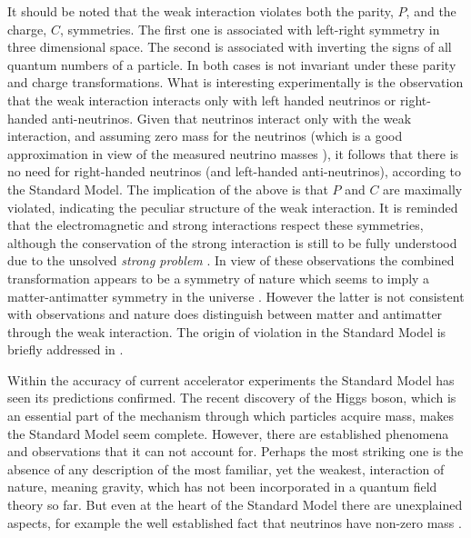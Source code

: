It should be noted that the weak interaction violates both the parity, $P$, and the charge, $C$, symmetries.
The first one is associated with left-right symmetry in three dimensional space.
The second is associated with inverting the signs of all quantum numbers of a particle.
In both cases  is not invariant under these parity and charge transformations.
What is interesting experimentally is the observation \cite{wu-parity,garwin-parity} that the weak interaction interacts
only with left handed neutrinos or right-handed anti-neutrinos. Given that neutrinos interact only with the weak interaction,
and assuming zero mass for the neutrinos (which is a good approximation in view of the measured neutrino masses \cite{nu-mass-superkam,nu-mass-kamland,nu-mass-sno,nu-mass-daya}),
it follows that there is no need for right-handed neutrinos (and left-handed anti-neutrinos), according to the Standard Model.
The implication of the above is that $P$ and $C$ are maximally violated, indicating the
peculiar structure of the weak interaction. It is reminded that the electromagnetic and
strong interactions respect these symmetries, although the \CP conservation of the strong interaction is still to be fully
understood due to the unsolved {\it strong \CP problem} \cite{Peccei:2006as}.
In view of these observations the combined \CP transformation appears to be
a symmetry of nature which seems to imply a matter-antimatter symmetry in the universe \cite{Sakharov:1967dj}.
However the latter is not consistent with observations and nature does distinguish between matter and antimatter
through the weak interaction. The origin of \CP violation in the Standard Model is briefly addressed in .

Within the accuracy of current accelerator experiments the Standard Model has seen its predictions confirmed.
The recent discovery of the Higgs boson, which is an essential part of the mechanism through which particles acquire mass,
makes the Standard Model seem complete. However, there are established phenomena and observations that it can not
account for. Perhaps the most striking one is the absence of any description of the most familiar, yet the weakest,
interaction of nature, meaning gravity, which has not been incorporated in a quantum field theory so far.
But even at the heart of the Standard Model there are unexplained aspects, for example the well established
fact that neutrinos have non-zero mass \cite{nu-mass-superkam,nu-mass-kamland,nu-mass-sno,nu-mass-daya}.

